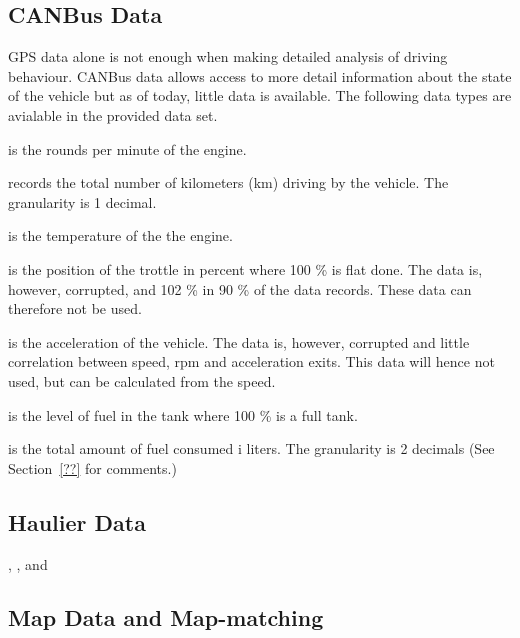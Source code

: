 \subsection{CANBus Data}
GPS data alone is not enough when making detailed analysis of driving behaviour.
CANBus data allows access to more detail information about the state of the vehicle but as of today, little data is available. 
The following data types are avialable in the provided data set.
\vspace{-5mm}
\begin{description*}
\item{} is the rounds per minute of the engine.
\item{} records the total number of kilometers (km) driving by the vehicle. The granularity is 1 decimal.
\item{} is the temperature of the the engine.
\item{} is the position of the trottle in percent where 100 \% is flat done. The data is, however, corrupted, and 102 \% in 90 \% of the data records. These data can therefore not be used.%
\item{} is the acceleration of the vehicle. The data is, however, corrupted and little correlation between speed, rpm and acceleration exits. This data will hence not used, but can be calculated from the speed.
\item{} is the level of fuel in the tank where 100 \% is a full tank.
\item{} is the total amount of fuel consumed i liters. The granularity is 2 decimals (See Section~\ref{??} for comments.) 
\item{}  
\item{}  
\end{description*}

\subsection{Haulier Data}
, ,  and     


\subsection{Map Data and Map-matching}
\vspace{-5mm}
\begin{description*}
\item{}
\item{}  
\end{description*}

